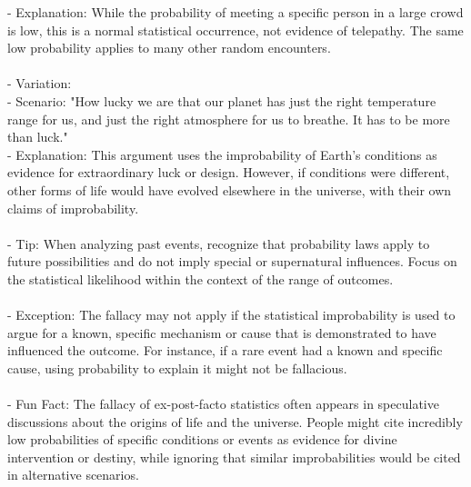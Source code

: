 \documentclass[a4paper,12pt,single,pdftex]{scrbook}
\begin{document}
    
        - Explanation: While the probability of meeting a specific person in a large crowd is low, this is a normal statistical occurrence, not evidence of telepathy. The same low probability applies to many other random encounters.
    \\

    
      
    \\

    
      - Variation:
    \\

    
        - Scenario: "How lucky we are that our planet has just the right temperature range for us, and just the right atmosphere for us to breathe. It has to be more than luck."
    \\

    
        - Explanation: This argument uses the improbability of Earth’s conditions as evidence for extraordinary luck or design. However, if conditions were different, other forms of life would have evolved elsewhere in the universe, with their own claims of improbability.
    \\

    
      
    \\

    
      - Tip: When analyzing past events, recognize that probability laws apply to future possibilities and do not imply special or supernatural influences. Focus on the statistical likelihood within the context of the range of outcomes.
    \\

    
      
    \\

    
      - Exception: The fallacy may not apply if the statistical improbability is used to argue for a known, specific mechanism or cause that is demonstrated to have influenced the outcome. For instance, if a rare event had a known and specific cause, using probability to explain it might not be fallacious.
    \\

    
      
    \\

    
      - Fun Fact: The fallacy of ex-post-facto statistics often appears in speculative discussions about the origins of life and the universe. People might cite incredibly low probabilities of specific conditions or events as evidence for divine intervention or destiny, while ignoring that similar improbabilities would be cited in alternative scenarios.
    \\
\end{document}
